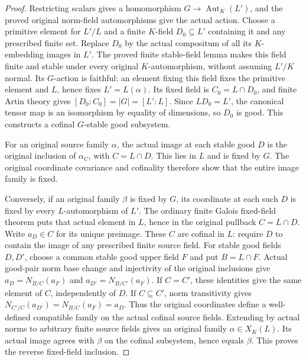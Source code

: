 \begin{proof}
Restricting scalars gives a homomorphism
$G\to\operatorname{Aut}_K(L')$, and the proved original norm-field
automorphisms give the actual action. Choose a primitive element for
$L'/L$ and a finite $K$-field $D_0\subseteq L'$ containing it and
any prescribed finite set. Replace $D_0$ by the actual compositum of
all its $K$-embedding images in $L'$. The proved finite stable-field
lemma makes this field finite and stable under every original
$K$-automorphism, without assuming $L'/K$ normal.
Its $G$-action is faithful: an element fixing this field fixes the
primitive element and $L$, hence fixes $L'=L(\alpha)$.
Its fixed field is $C_0=L\cap D_0$, and finite Artin theory gives
$[D_0:C_0]=|G|=[L':L]$. Since $LD_0=L'$, the canonical tensor map
is an isomorphism by equality of dimensions, so $D_0$ is good.
This constructs a cofinal $G$-stable good subsystem.

For an original source family $\alpha$, the actual image at each
stable good $D$ is the original inclusion of $\alpha_C$, with
$C=L\cap D$. This lies in $L$ and is fixed by $G$. The original
coordinate covariance and cofinality therefore show that the entire
image family is fixed.

Conversely, if an original family $\beta$ is fixed by $G$, its
coordinate at each such $D$ is fixed by every $L$-automorphism of
$L'$. The ordinary finite Galois fixed-field theorem puts that actual
element in $L$, hence in the original pullback $C=L\cap D$.
Write $a_D\in C$ for its unique preimage. These $C$ are cofinal in
$L$: require $D$ to contain the image of any prescribed finite source
field. For stable good fields $D,D'$, choose a common stable good
upper field $F$ and put $B=L\cap F$. Actual good-pair norm base
change and injectivity of the original inclusions give
$a_D=N_{B/C}(a_F)$ and $a_{D'}=N_{B/C'}(a_F)$.
If $C=C'$, these identities give the same element of $C$, independently
of $D$. If $C\subseteq C'$, norm transitivity gives
$N_{C'/C}(a_{D'})=N_{B/C}(a_F)=a_D$.
Thus the original coordinates define a well-defined compatible family
on the actual cofinal source fields.
Extending by actual norms to arbitrary finite source fields gives an
original family $\alpha\in X_K(L)$. Its actual image agrees with
$\beta$ on the cofinal subsystem, hence equals $\beta$.
This proves the reverse fixed-field inclusion.
\end{proof}

